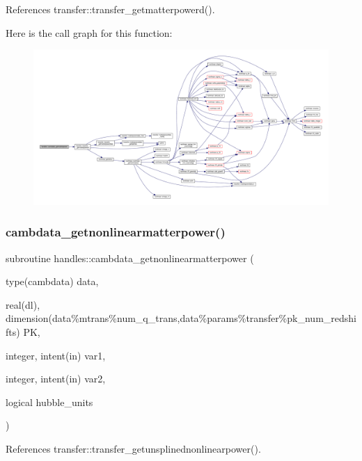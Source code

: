 References transfer\+::transfer\+\_\+getmatterpowerd().

Here is the call graph for this function\+:
\nopagebreak
\begin{figure}[H]
\begin{center}
\leavevmode
\includegraphics[width=350pt]{namespacehandles_a77db4a8f3a15895102aa6f7c7e49d5f8_cgraph}
\end{center}
\end{figure}
\mbox{\label{namespacehandles_a26542fd10068a2b3d57617a97f935286}} 
\subsubsection{\texorpdfstring{cambdata\+\_\+getnonlinearmatterpower()}{cambdata\_getnonlinearmatterpower()}}
{\footnotesize\ttfamily subroutine handles\+::cambdata\+\_\+getnonlinearmatterpower (\begin{DoxyParamCaption}\item[{type(cambdata)}]{data,  }\item[{real(dl), dimension(data\%mtrans\%num\+\_\+q\+\_\+trans,data\%params\%transfer\%pk\+\_\+num\+\_\+redshifts)}]{PK,  }\item[{integer, intent(in)}]{var1,  }\item[{integer, intent(in)}]{var2,  }\item[{logical}]{hubble\+\_\+units }\end{DoxyParamCaption})}



References transfer\+::transfer\+\_\+getunsplinednonlinearpower().

